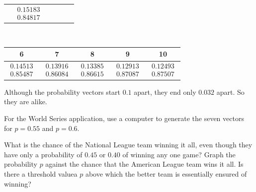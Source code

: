 \begin{exercises}
\begin{answer}
\begin{exparts}
\begin{center}
\begin{tabular}{c|ccccc}
               &$\begin{array}{c}   0.15183 \\ 0.84817 \end{array}$
             \end{tabular}                                         \\[1ex]
             \begin{tabular}{|ccccc}
               6  &7  &8  &9 &10 \\ 
               \hline
               $\begin{array}{c}  0.14513 \\ 0.85487  \end{array}$
               &$\begin{array}{c}  0.13916 \\ 0.86084  \end{array}$
               &$\begin{array}{c}  0.13385 \\ 0.86615  \end{array}$
               &$\begin{array}{c}  0.12913 \\ 0.87087  \end{array}$
               &$\begin{array}{c}  0.12493 \\ 0.87507  \end{array}$
             \end{tabular}
           \end{center}
          \partsitem Although the probability vectors start $0.1$ apart,
            they end only $0.032$ apart.
            So they are alike.
       \end{exparts}
     \end{answer}  
  \item 
    For the World Series application, use a computer to generate
    the seven vectors for $p=0.55$ and $p=0.6$.
    \begin{exparts}
      \partsitem What is the chance of the National League team winning it all,
        even though they have only a probability of $0.45$ or $0.40$ of
        winning any one game?
      \partsitem Graph the probability $p$ against the chance that the
        American League team wins it all.
        Is there a threshold value\Dash a $p$ above which the better team
        is essentially ensured of winning?
    \end{exparts}
    \begin{answer}

\end{answer}
\end{exercises}
